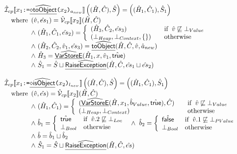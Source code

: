 \documentclass{article}
\makeatletter
\newcommand{\SF}[1]{\mbox{\textsf{#1}}}
\newcommand{\TT}[1]{\mbox{\texttt{#1}}}
\newcommand{\wherec}[1]{{\rm where}\begin{array}[t]{l}#1\end{array}}
\newcommand{\ifc}[1]{{\rm if}\begin{array}[t]{l}#1\end{array}}
\newcommand{\owc}{{\rm otherwise}}
\newcommand{\I}{\mathcal{I}}
\newcommand{\V}{\mathcal{V}}
\newcommand{\aI}{\hat{\mathcal{I}}}
\newcommand{\aV}{\hat{\mathcal{V}}}
\newcommand{\lbr}{\llbracket}
\newcommand{\rbr}{\rrbracket}
\newcommand{\hfi}[1]{\hf{\ensuremath{\diamond}#1}}
\newcommand{\hf}[1]{\underline{\sf #1}}
\newcommand{\ahf}[1]{\widehat{\underline{\sf #1}}}
\newcommand{\ahfi}[1]{\ahf{\ensuremath{\diamond}#1}}
\newcommand{\varloc}[1]{\##1}
\newcommand{\varprop}[1]{@#1}
\newcommand{\atrue}{\hat{\SF{true}}}
\newcommand{\afalse}{\hat{\SF{false}}}
\makeatother
\begin{document}
\[\begin{array}{ll}
\aI_{cp}\lbr x_1 \TT{:=} \ahfi{toObject}\TT{(}x_2\TT{)}_{a_{new}} \rbr \left((\hat{H},\hat{C}),\hat{S}\right)
 = \left((\hat{H}_1,\hat{C}_1),\hat{S}_1\right)\\
 \quad\wherec{
   (\hat{v},\hat{es}_1) = \aV_{cp}\lbr x_2\rbr(\hat{H},\hat{C}) \\
    \land\ (\hat{H}_1, \hat{C}_1,\hat{es}_2) = \left\{
     \begin{array}{ll}
       (\hat{H}_3, \hat{C}_2, \hat{es}_3)
       & \quad\ifc{\hat{v}\not\sqsubseteq\bot_{Value}} \\
       (\bot_{Heap}, \bot_{Context}, \{ \}) & \quad\owc
     \end{array}
   \right.\\
   \land\ (\hat{H}_2, \hat{C}_2, \hat{v}_1, \hat{es}_3) = \ahf{toObject}(\hat{H}, \hat{C}, \hat{v}, \hat{a}_{new}) \\
   \land\ \hat{H}_3 = \ahf{VarStoreE}(\hat{H}_1,x,\hat{v}_1, \atrue) \\
   \land\ \hat{S}_1 = \hat{S}\sqcup\ahf{RaiseException}(\hat{H},\hat{C}, \hat{es}_1\sqcup \hat{es}_2)
 }
\\
\\
\aI_{cp}\lbr x_1 \TT{:=} \ahfi{isObject}\TT{(}x_2\TT{)}_{l_{new}} \rbr \left((\hat{H},\hat{C}),\hat{S}\right)
 = \left((\hat{H}_1,\hat{C}_1),\hat{S}_1\right)\\
 \quad\wherec{
   (\hat{v},\hat{es})=\aV_{cp}\lbr x_2\rbr(\hat{H},\hat{C})\\
   \land\ (\hat{H}_1, \hat{C}_1) = \left\{
     \begin{array}{ll}
       (\ahf{VarStoreE}(\hat{H},x_1,\hat{b}_{Value},\atrue), \hat{C})
       & \quad\ifc{\hat{v}\not\sqsubseteq\bot_{Value}} \\
       (\bot_{Heap}, \bot_{Context}) & \quad\owc
     \end{array}
   \right.\\
   \land\ \hat{b}_1 = \left\{
     \begin{array}{ll}
       \atrue & \ifc{\hat{v}.2 \not\sqsubseteq \bot_{Loc}} \\
       \bot_{Bool} & \owc \\
     \end{array}
   \right. 
   \land\ \hat{b}_2 = \left\{
     \begin{array}{ll}
       \afalse & \ifc{\hat{v}.1 \not\sqsubseteq \bot_{PValue}} \\
       \bot_{Bool} & \owc \\
     \end{array}
   \right. \\
   \land\ \hat{b} = \hat{b}_1 \sqcup \hat{b}_2 \\
   \land\ \hat{S}_1 = \hat{S}\sqcup\ahf{RaiseException}(\hat{H},\hat{C}, \hat{es})
 }
\\
\\


\end{array}\]
\end{document}

